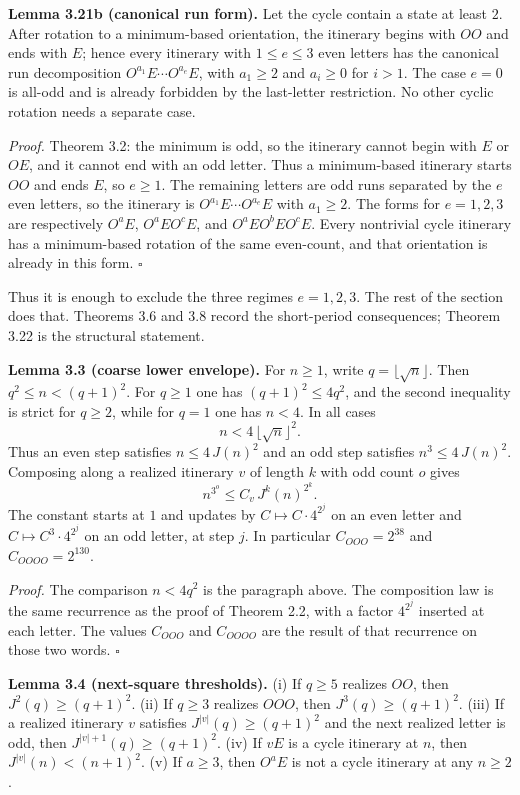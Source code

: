 \documentclass[12pt]{article}
\begin{document}
\textbf{Lemma 3.21b (canonical run form).} Let the cycle contain a state
at least \(2\). After rotation to a minimum-based orientation, the
itinerary begins with \(OO\) and ends with \(E\); hence every itinerary
with \(1\le e\le 3\) even letters has the canonical run decomposition
\(O^{a_1}E\cdots O^{a_e}E\), with \(a_1\ge2\) and \(a_i\ge0\) for
\(i>1\). The case \(e=0\) is all-odd and is already forbidden by the
last-letter restriction. No other cyclic rotation needs a separate case.

\emph{Proof.} Theorem 3.2: the minimum is odd, so the itinerary cannot
begin with \(E\) or \(OE\), and it cannot end with an odd letter. Thus a
minimum-based itinerary starts \(OO\) and ends \(E\), so \(e\ge 1\). The
remaining letters are odd runs separated by the \(e\) even letters, so
the itinerary is \(O^{a_1}E\cdots O^{a_e}E\) with \(a_1\ge 2\). The
forms for \(e=1,2,3\) are respectively \(O^aE\), \(O^aEO^cE\), and
\(O^aEO^bEO^cE\). Every nontrivial cycle itinerary has a minimum-based
rotation of the same even-count, and that orientation is already in this
form. \(\square\)

Thus it is enough to exclude the three regimes \(e=1,2,3\). The rest of
the section does that. Theorems 3.6 and 3.8 record the short-period
consequences; Theorem 3.22 is the structural statement.

\textbf{Lemma 3.3 (coarse lower envelope).} For \(n\ge 1\), write
\(q=\lfloor\sqrt n\rfloor\). Then \(q^2\le n<(q+1)^2\). For \(q\ge 1\)
one has \((q+1)^2\le 4q^2\), and the second inequality is strict for
\(q\ge 2\), while for \(q=1\) one has \(n<4\). In all cases \[
n<4\,\lfloor\sqrt n\rfloor^2.
\] Thus an even step satisfies \(n\le 4\,J(n)^2\) and an odd step
satisfies \(n^3\le 4\,J(n)^2\). Composing along a realized itinerary
\(v\) of length \(k\) with odd count \(o\) gives \[
n^{3^{o}}\le C_v\,J^{k}(n)^{2^{k}}.
\] The constant starts at \(1\) and updates by
\(C\mapsto C\cdot 4^{2^{j}}\) on an even letter and
\(C\mapsto C^{3}\cdot 4^{2^{j}}\) on an odd letter, at step \(j\). In
particular \(C_{OOO}=2^{38}\) and \(C_{OOOO}=2^{130}\).

\emph{Proof.} The comparison \(n<4q^2\) is the paragraph above. The
composition law is the same recurrence as the proof of Theorem 2.2, with
a factor \(4^{2^j}\) inserted at each letter. The values \(C_{OOO}\) and
\(C_{OOOO}\) are the result of that recurrence on those two words.
\(\square\)

\textbf{Lemma 3.4 (next-square thresholds).} (i) If \(q\ge 5\) realizes
\(OO\), then \(J^2(q)\ge(q+1)^2\). (ii) If \(q\ge 3\) realizes \(OOO\),
then \(J^3(q)\ge(q+1)^2\). (iii) If a realized itinerary \(v\) satisfies
\(J^{|v|}(q)\ge(q+1)^2\) and the next realized letter is odd, then
\(J^{|v|+1}(q)\ge(q+1)^2\). (iv) If \(vE\) is a cycle itinerary at
\(n\), then \(J^{|v|}(n)<(n+1)^2\). (v) If \(a\ge 3\), then \(O^aE\) is
not a cycle itinerary at any \(n\ge 2\).
\end{document}
